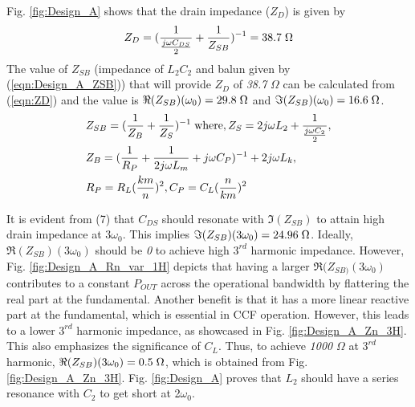 \documentclass[conference]{IEEEtran}
\begin{document}
Fig. \ref{fig:Design_A} shows that the drain impedance ($Z_D$) is given by
\vspace{-0.05in}
\begin{equation}
    Z_D=(\frac{1}{\frac{j\omega C_{DS}}{2}}+\frac{1}{Z_{SB}})^{-1}=38.7 \hspace{1mm} \Omega
    \label{eqn:ZD}
\end{equation}
The value of $Z_{SB}$ (impedance of $L_2C_2$ and balun given by (\ref{eqn:Design_A_ZSB})) that will provide $Z_D$ of \textit{38.7} $\Omega$ can be calculated from (\ref{eqn:ZD}) and the value is $\Re(Z_{SB})(\omega_0) =  29.8\hspace{1mm} \Omega$ and $\Im(Z_{SB})(\omega_0) = 16.6\hspace{1mm}\Omega$.
\vspace{-0.05in}
\begin{equation}
\begin{aligned}
    &Z_{SB}=(\frac{1}{Z_B}+\frac{1}{Z_S})^{-1}
    \hspace{1mm}\text{where}, Z_S=2j\omega  L_2+\frac{1}{\frac{j \omega C_2}{2}}, \\
    &Z_B=(\frac{1}{R_P}+\frac{1}{2j \omega  L_m}+j \omega C_P)^{-1}+2j \omega  L_k,\\ &R_P=R_L(\frac{km}{n})^2,C_P=C_L(\frac{n}{km})^2
\label{eqn:Design_A_ZSB}
\end{aligned}
\end{equation}

\color{blue} It is evident from (7) that $C_{DS}$ should resonate with $\Im(Z_{SB})$ to attain high drain impedance at $3\omega_0$. This implies $\Im(Z_{SB})(3\omega_0) = 24.96\hspace{1mm}\Omega$. \color{black} Ideally, $\Re(Z_{SB})(3\omega_0)$ should be \textit{0} to achieve high $3^{rd}$ harmonic impedance\color{blue}. However, \color{black} Fig. \ref{fig:Design_A_Rn_var_1H} depicts that having a larger $\Re(Z_{SB)}(3\omega_0)$ \color{blue} contributes to a \color{black} constant $P_{OUT}$ across the operational bandwidth by \color{blue} flattering the \color{black} real part at the fundamental. Another benefit is that it has \color{blue} a \color{black} more linear reactive part at the fundamental\color{blue}, which is essential \color{black} in CCF operation.
However, this leads to a lower $3^{rd}$ harmonic impedance, as showcased in Fig. \ref{fig:Design_A_Zn_3H}. This also emphasizes  the significance of $C_L$. \color{blue} Thus, \color{black} to achieve \textit{1000} $\Omega$ at $3^{rd}$ harmonic,  $\Re(Z_{SB})(3\omega_0) = 0.5\hspace{1mm}\Omega$, which is obtained from Fig. \ref{fig:Design_A_Zn_3H}. Fig. \ref{fig:Design_A} proves that $L_2$ should have a series resonance with $C_2$ to get short at 2$\omega_0$.
\end{document}
